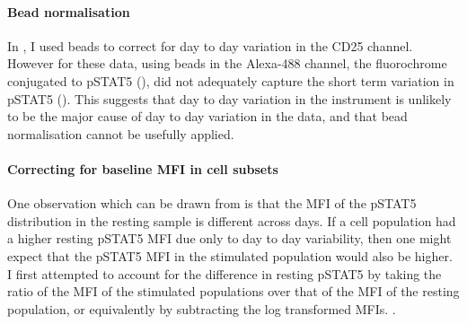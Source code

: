 \paragraph{Bead normalisation} 
In , I used beads to correct for day to day variation in the CD25 channel.
However for these data, using beads in the Alexa-488 channel, the fluorochrome conjugated to pSTAT5 (),
did not adequately capture the short term variation in pSTAT5 ().  
This suggests that day to day variation in the instrument is unlikely to be the major cause of day to day variation in the data, and that bead normalisation cannot be usefully applied.

\paragraph{ Correcting for baseline MFI in cell subsets }
One observation which can be drawn from  is that the
MFI of the pSTAT5 distribution in the resting sample is different across days.
If a cell population had a higher resting pSTAT5 MFI due only to day to day variability,
then one might expect that the pSTAT5 MFI in the stimulated population would also be higher.
I first attempted to account for the difference in resting pSTAT5 by
taking the ratio of the MFI of the stimulated populations over that of the MFI of the resting population,
or equivalently by subtracting the log transformed MFIs.
.

